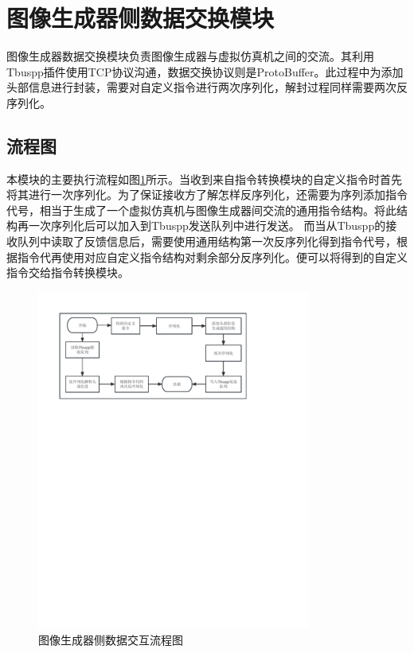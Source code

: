 \section{图像生成器侧数据交换模块}
图像生成器数据交换模块负责图像生成器与虚拟仿真机之间的交流。其利用Tbuspp插件使用TCP协议沟通，数据交换协议则是ProtoBuffer。此过程中为添加头部信息进行封装，需要对自定义指令进行两次序列化，解封过程同样需要两次反序列化。
\subsection{流程图}
 本模块的主要执行流程如图\ref{module31}所示。当收到来自指令转换模块的自定义指令时首先将其进行一次序列化。为了保证接收方了解怎样反序列化，还需要为序列添加指令代号，相当于生成了一个虚拟仿真机与图像生成器间交流的通用指令结构。将此结构再一次序列化后可以加入到Tbuspp发送队列中进行发送。
 而当从Tbuspp的接收队列中读取了反馈信息后，需要使用通用结构第一次反序列化得到指令代号，根据指令代再使用对应自定义指令结构对剩余部分反序列化。便可以将得到的自定义指令交给指令转换模块。

 \begin{figure}[h!]
    \begin{center}
        \includegraphics[width=0.8\textwidth]{pictures/flowchart3.pdf}
        \caption{图像生成器侧数据交互流程图}
        \label{module31}
    \end{center}
\end{figure}

